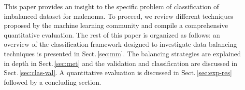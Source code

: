 This paper provides an insight to the specific problem of classification of imbalanced dataset for malenoma. 
To proceed, we review different techniques proposed by the machine learning community and compile a comprehensive quantitative evaluation. 
The rest of this paper is organized as follows: an overview of the classification framework designed to investigate data balancing techniques is presented in Sect.\,\ref{sec:mm}.
The balancing strategies are explained in depth in Sect.\,\ref{sec:met} and the validation and classification are discussed in Sect.\,\ref{sec:clas-val}.
A quantitative evaluation is discussed in Sect.\,\ref{sec:exp-res} followed by a concluding section.




